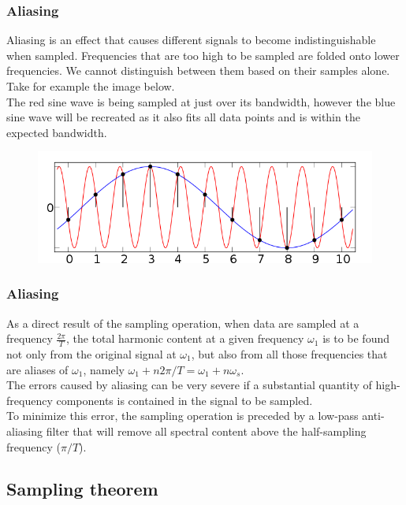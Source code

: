 \begin{frame}
	\frametitle{Aliasing}
	Aliasing is	an effect that causes different signals to become indistinguishable when sampled. Frequencies that are too high to be sampled are folded onto lower frequencies. We cannot distinguish between them based on their samples alone.\\
	\medskip
	Take for example the image below.\\
	The red sine wave is being sampled at just over its bandwidth, however the blue sine wave will be recreated as it also fits all data points and is within the expected bandwidth.
	\begin{figure}
		\includegraphics[width=0.75\linewidth]{aliasing}
	\end{figure}
\end{frame}

\begin{frame}
	\frametitle{Aliasing}
	As a direct result of the sampling operation, when data are sampled at a frequency $\frac{2\pi}{T}$, the total harmonic content at a given frequency $\omega_1$ is to be found not only from the original signal at $\omega_1$, but also from all those frequencies that are aliases of $\omega_1$, namely $\omega_1 + n2\pi/T = \omega_1+n\omega_s$.\\
	\medskip
	The errors caused by aliasing can be very severe if a substantial quantity of high-frequency components is contained in the signal to be sampled.\\
	\medskip
	To minimize this error, the sampling operation is preceded by a low-pass anti-aliasing filter that will remove all spectral content above the half-sampling frequency ($\pi/T$).
\end{frame}

\subsection{Sampling theorem}

